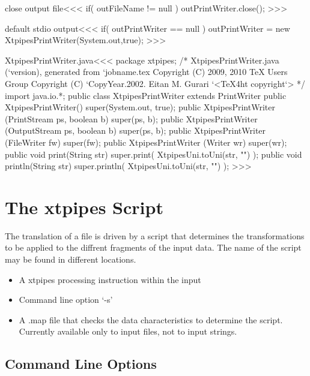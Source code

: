 \documentclass{article}
\begin{document}
{\<close output file\><<<
if( outFileName != null ){
   outPrintWriter.close();
}
>>>

\<default stdio output\><<<
if( outPrintWriter == null ){
   outPrintWriter = new XtpipesPrintWriter(System.out,true);
}
>>>

% 

\<XtpipesPrintWriter.java\><<<
package xtpipes;
/* XtpipesPrintWriter.java (`version), generated from `jobname.tex
   Copyright (C) 2009, 2010 TeX Users Group
   Copyright (C) `CopyYear.2002. Eitan M. Gurari
`<TeX4ht copyright`> */
import java.io.*;
public class XtpipesPrintWriter extends PrintWriter {
   public XtpipesPrintWriter() {
     super(System.out, true);
   }
   public XtpipesPrintWriter (PrintStream ps, boolean b){
     super(ps, b);
   }
   public XtpipesPrintWriter (OutputStream ps, boolean b){
     super(ps, b);
   }
   public XtpipesPrintWriter (FileWriter fw){
     super(fw);
   }
   public XtpipesPrintWriter (Writer wr){
     super(wr);
   }
   public void print(String str) {
     super.print( XtpipesUni.toUni(str, "") );
   }
   public void println(String str) {
     super.println( XtpipesUni.toUni(str, "") );
}  }
>>>





\section{The xtpipes Script}


The translation of a file is driven by a script that determines the
transformations to be applied to the diffrent fragments of the input
data.  The name of the script may be found in different locations.

\begin{itemize}
\item
A xtpipes processing instruction within the input
\item
Command line option `-s'
\item
A .map  file that checks the data characteristics to determine the
script. Currently available only to input files, not to input strings.
\end{itemize}



\subsection{Command Line Options}


}
\end{document}

